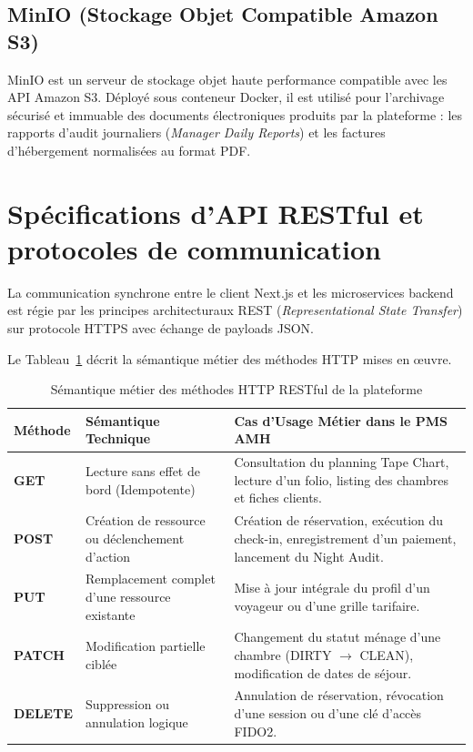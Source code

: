 \documentclass[12pt,a4paper,oneside]{report}
\begin{document}
\subsection{MinIO (Stockage Objet Compatible Amazon S3)}

MinIO est un serveur de stockage objet haute performance compatible avec les API Amazon S3. Déployé sous conteneur Docker, il est utilisé pour l'archivage sécurisé et immuable des documents électroniques produits par la plateforme : les rapports d'audit journaliers (\textit{Manager Daily Reports}) et les factures d'hébergement normalisées au format PDF.

\section{Spécifications d'API RESTful et protocoles de communication}

La communication synchrone entre le client Next.js et les microservices backend est régie par les principes architecturaux REST (\textit{Representational State Transfer}) sur protocole HTTPS avec échange de payloads JSON.

Le Tableau~\ref{tab:api_verbs_detail} décrit la sémantique métier des méthodes HTTP mises en œuvre.

\begin{table}[H]
\centering
\small
\renewcommand{\arraystretch}{1.3}
\begin{tabularx}{\textwidth}{|p{2.5cm}|p{4.5cm}|X|}
\hline
\textbf{Méthode} & \textbf{Sémantique Technique} & \textbf{Cas d'Usage Métier dans le PMS AMH} \\
\hline
\textbf{GET} & Lecture sans effet de bord (Idempotente) & Consultation du planning Tape Chart, lecture d'un folio, listing des chambres et fiches clients. \\
\hline
\textbf{POST} & Création de ressource ou déclenchement d'action & Création de réservation, exécution du check-in, enregistrement d'un paiement, lancement du Night Audit. \\
\hline
\textbf{PUT} & Remplacement complet d'une ressource existante & Mise à jour intégrale du profil d'un voyageur ou d'une grille tarifaire. \\
\hline
\textbf{PATCH} & Modification partielle ciblée & Changement du statut ménage d'une chambre (DIRTY $\rightarrow$ CLEAN), modification de dates de séjour. \\
\hline
\textbf{DELETE} & Suppression ou annulation logique & Annulation de réservation, révocation d'une session ou d'une clé d'accès FIDO2. \\
\hline
\end{tabularx}
\caption{Sémantique métier des méthodes HTTP RESTful de la plateforme}
\label{tab:api_verbs_detail}
\end{table}
\end{document}
